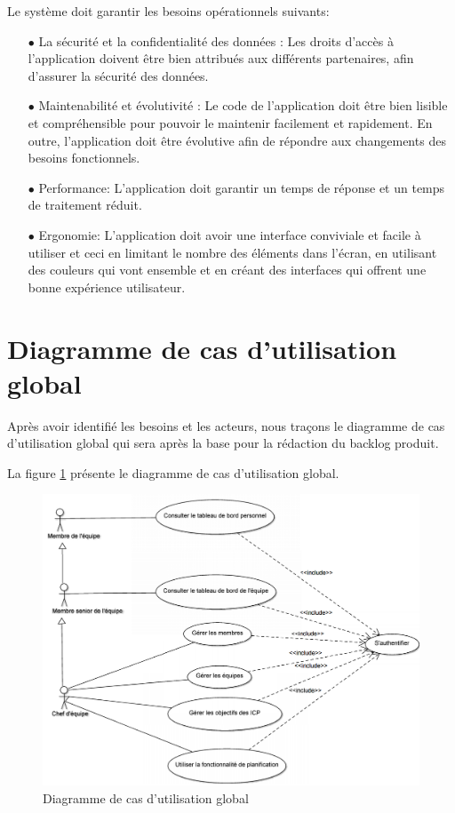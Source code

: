 Le système doit garantir les besoins opérationnels suivants:\\
\begin{itemize}
	\item[$\bullet$] La sécurité et la confidentialité des données : Les droits d’accès à
l’application doivent être bien attribués aux différents partenaires, afin
d’assurer la sécurité des données.\\
	\item[$\bullet$] Maintenabilité et évolutivité : Le code de l’application doit être bien lisible et
compréhensible pour pouvoir le maintenir facilement et rapidement. En outre,
l’application doit être évolutive afin de répondre aux changements des
besoins fonctionnels.\\
	\item[$\bullet$] Performance: L'application doit garantir un temps de réponse et un temps de traitement réduit.\\
    \item[$\bullet$] Ergonomie: L'application doit avoir une interface conviviale et facile à utiliser et ceci en limitant le nombre des éléments dans l'écran, en utilisant des couleurs qui vont ensemble et en créant des interfaces qui offrent une bonne expérience utilisateur.
\end{itemize}
\section{Diagramme de cas d'utilisation global}
Après avoir identifié les besoins et les acteurs, nous traçons le diagramme de cas d'utilisation global qui sera après la base pour la rédaction du backlog produit.

La figure \ref{code7} présente le diagramme de cas d'utilisation global.
\begin{figure}[H]
  \centering
  \includegraphics[scale=0.6]{figures/UC_global.png}
  \caption{Diagramme de cas d'utilisation global}
  \label{code7}
\end{figure}
